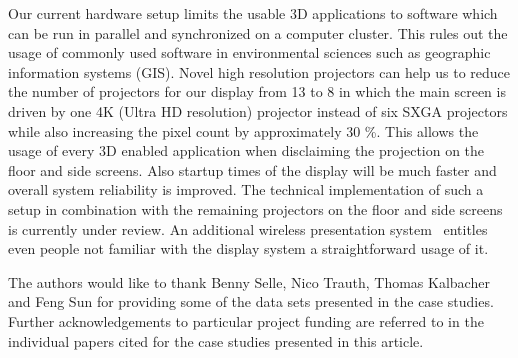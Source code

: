 \documentclass[twocolumn]{svjour3}          %
\newcommand{\myedit}[2]{\textcolor{red}{\st{#1}} \textcolor{blue}{#2}}
\begin{document}
Our current hardware setup limits the usable 3D applications to software which can be run in parallel and synchronized on a computer cluster. This rules out the usage of commonly used software in environmental sciences such as geographic information systems (GIS). Novel high resolution projectors can help us to reduce the number of projectors for our display from 13 to 8 in which the main screen is driven by one 4K (Ultra HD resolution) projector instead of six SXGA projectors while also increasing the pixel count by approximately 30 \%. This allows the usage of every 3D enabled application when disclaiming the projection on the floor and side screens. Also startup times of the display will be much faster and overall system reliability is improved. The technical implementation of such a setup in combination with the remaining projectors on the floor and side screens is currently under review. An additional wireless presentation system~\cite{web:clickshare} entitles even people not familiar with the display system a straightforward usage of it.




\begin{acknowledgements}
The authors would like to thank Benny Selle, Nico Trauth, Thomas Kalbacher and Feng Sun for providing some of the data sets presented in the case studies. Further acknowledgements to particular project funding are referred to in the individual papers cited for the case studies presented in this article.
\end{acknowledgements}

\end{document}
